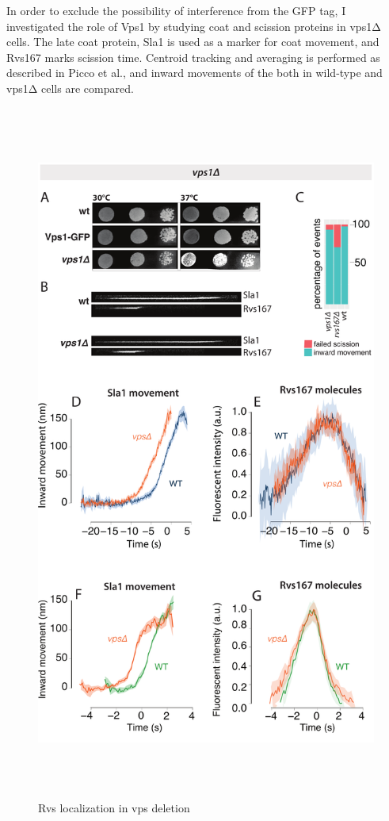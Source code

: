 	\vspace{5mm}
	In order to exclude the possibility of interference from the GFP tag, I investigated the role of Vps1 by studying coat and scission proteins in vps1Δ cells. The late coat protein, Sla1 is used as a marker for coat movement, and Rvs167 marks scission time. Centroid tracking and averaging is performed as described in Picco et al., and inward movements of the both in wild-type and vps1Δ cells are compared. 

	\begin{figure}
	\centering
	\includegraphics[width=23cm,height=23cm,keepaspectratio]{figures/results_final/vps}
		\caption{Rvs localization in vps deletion\label{fig3_vpsdel}}
	\end{figure}

